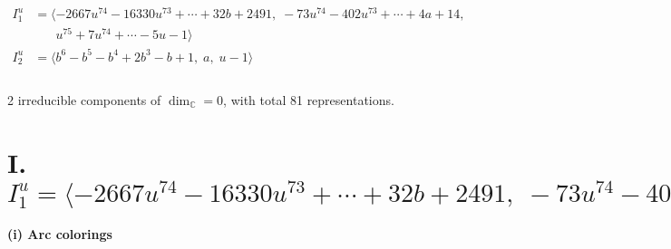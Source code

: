 \documentclass[1p]{elsarticle_modified}
\theoremstyle{definition}
\begin{document}
\begin{align*}
I^u_{1}&=\langle 
-2667 u^{74}-16330 u^{73}+\cdots+32 b+2491,\;-73 u^{74}-402 u^{73}+\cdots+4 a+14,\\
\phantom{I^u_{1}}&\phantom{= \langle  }u^{75}+7 u^{74}+\cdots-5 u-1\rangle \\
I^u_{2}&=\langle 
b^6- b^5- b^4+2 b^3- b+1,\;a,\;u-1\rangle \\
\\
\end{align*}
\raggedright * 2 irreducible components of $\dim_{\mathbb{C}}=0$, with total 81 representations.\\
\newpage
\renewcommand{\arraystretch}{1}
\centering \section*{I. $I^u_{1}= \langle -2667 u^{74}-16330 u^{73}+\cdots+32 b+2491,\;-73 u^{74}-402 u^{73}+\cdots+4 a+14,\;u^{75}+7 u^{74}+\cdots-5 u-1 \rangle$}
\flushleft \textbf{(i) Arc colorings}\\
\end{document}
